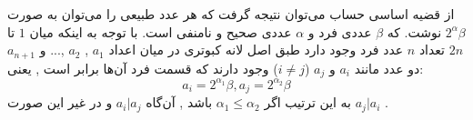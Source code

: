 \p
    از قضیه اساسی حساب می‌توان نتیجه گرفت که هر عدد طبیعی را می‌توان به صورت
    $2^{\alpha}{\beta}$
    نوشت.
    که
    $\beta$ 
     عددی فرد و
     $\alpha$ 
     عددی صحیح و نامنفی است.
    با توجه به اینکه میان 
    $1$
    تا
    $2n$
    تعداد 
    $n$
    عدد فرد وجود دارد طبق اصل لانه کبوتری در میان اعداد
    $a_1$
    ,
    $a_2$
    ,...
    و
    $a_{n+1}$
    دو عدد مانند
    $a_i$
    و
    $a_j$
    ($i\neq j$)
    وجود دارند که قسمت فرد آن‌ها برابر است
    ,
    یعنی:
    $$a_i=2^{\alpha_1}\beta,a_j=2^{\alpha_2}\beta$$
    به این ترتیب اگر
    $\alpha_1 \leq \alpha_2$
    باشد
    ,
    آن‌گاه
    $a_i|a_j$
    و در غیر این صورت
    $a_j|a_i$
    .
